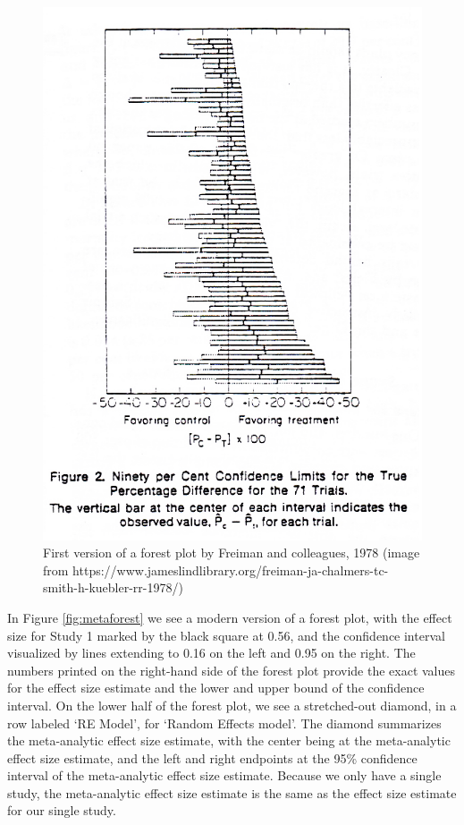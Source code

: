 \documentclass[
  oneside]{book}
\begin{document}
\begin{figure}

{\centering \includegraphics[width=1\linewidth]{images/freiman1978} 

}

\caption{First version of a forest plot by Freiman and colleagues, 1978 (image from https://www.jameslindlibrary.org/freiman-ja-chalmers-tc-smith-h-kuebler-rr-1978/)}\label{fig:freiman1978}
\end{figure}

In Figure \ref{fig:metaforest} we see a modern version of a forest plot, with the effect size for Study 1 marked by the black square at 0.56, and the confidence interval visualized by lines extending to 0.16 on the left and 0.95 on the right. The numbers printed on the right-hand side of the forest plot provide the exact values for the effect size estimate and the lower and upper bound of the confidence interval. On the lower half of the forest plot, we see a stretched-out diamond, in a row labeled `RE Model', for `Random Effects model'. The diamond summarizes the meta-analytic effect size estimate, with the center being at the meta-analytic effect size estimate, and the left and right endpoints at the 95\% confidence interval of the meta-analytic effect size estimate. Because we only have a single study, the meta-analytic effect size estimate is the same as the effect size estimate for our single study.
\end{document}
